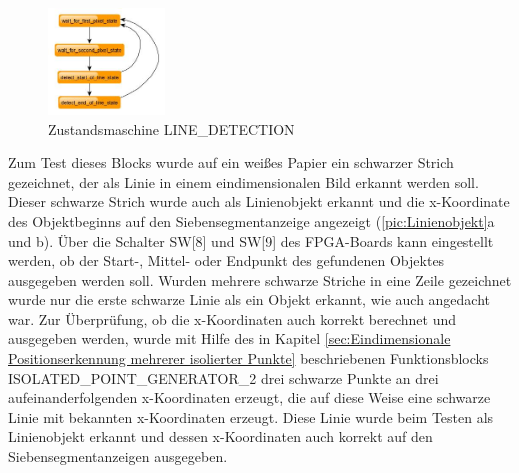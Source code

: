 \documentclass[ngerman,12pt]{article} %
\begin{document}
{\begin{figure}[htbp]
	\begin{center}
	\includegraphics[width = 0.275\textwidth]{LINE_DETECTION}
	\caption[Zustandsmaschine LINE\_DETECTION]{\label{pic:Zustandsmaschine LINE_DETECTION}Zustandsmaschine LINE\_DETECTION}
	\end{center}
\end{figure}

Zum Test dieses Blocks wurde auf ein weißes Papier ein schwarzer Strich gezeichnet, der als Linie in einem eindimensionalen Bild erkannt werden soll. Dieser schwarze Strich wurde auch als Linienobjekt erkannt und die x-Koordinate des Objektbeginns auf den Siebensegmentanzeige angezeigt (\autoref{pic:Linienobjekt}a und b). Über die Schalter SW[8] und SW[9] des FPGA-Boards kann eingestellt werden, ob der Start-, Mittel- oder Endpunkt des gefundenen Objektes ausgegeben werden soll. Wurden mehrere schwarze Striche in eine Zeile gezeichnet wurde nur die erste schwarze Linie als ein Objekt erkannt, wie auch angedacht war. Zur Überprüfung, ob die x-Koordinaten auch korrekt berechnet und ausgegeben werden, wurde mit Hilfe des in Kapitel \ref{sec:Eindimensionale Positionserkennung mehrerer isolierter Punkte} beschriebenen Funktionsblocks ISOLATED\_POINT\_GENERATOR\_2 drei schwarze Punkte an drei aufeinanderfolgenden x-Koordinaten erzeugt, die auf diese Weise eine schwarze Linie mit bekannten x-Koordinaten erzeugt. Diese Linie wurde beim Testen als Linienobjekt erkannt und dessen x-Koordinaten auch korrekt auf den Siebensegmentanzeigen ausgegeben.\newline

}
\end{document}
